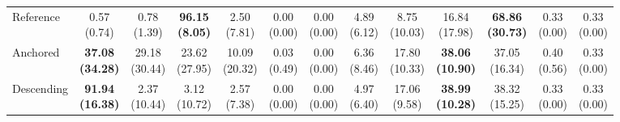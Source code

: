 {\begin{tabular}{l|cccccc|cccccc}
Reference & \makecell{0.57 \\ (0.74)} & \makecell{0.78 \\ (1.39)} & {\cellcolor[HTML]{C8E6C9}} \bfseries \makecell{96.15 \\ (8.05)} & \makecell{2.50 \\ (7.81)} & \makecell{0.00 \\ (0.00)} & \makecell{0.00 \\ (0.00)} & \makecell{4.89 \\ (6.12)} & \makecell{8.75 \\ (10.03)} & {\cellcolor[HTML]{C8E6C9}} \makecell{16.84 \\ (17.98)} & \bfseries \makecell{68.86 \\ (30.73)} & \makecell{0.33 \\ (0.00)} & \makecell{0.33 \\ (0.00)} \\
Anchored & \bfseries \makecell{37.08 \\ (34.28)} & \makecell{29.18 \\ (30.44)} & {\cellcolor[HTML]{C8E6C9}} \makecell{23.62 \\ (27.95)} & \makecell{10.09 \\ (20.32)} & \makecell{0.03 \\ (0.49)} & \makecell{0.00 \\ (0.00)} & \makecell{6.36 \\ (8.46)} & \makecell{17.80 \\ (10.33)} & {\cellcolor[HTML]{C8E6C9}} \bfseries \makecell{38.06 \\ (10.90)} & \makecell{37.05 \\ (16.34)} & \makecell{0.40 \\ (0.56)} & \makecell{0.33 \\ (0.00)} \\
Descending & \bfseries \makecell{91.94 \\ (16.38)} & \makecell{2.37 \\ (10.44)} & {\cellcolor[HTML]{C8E6C9}} \makecell{3.12 \\ (10.72)} & \makecell{2.57 \\ (7.38)} & \makecell{0.00 \\ (0.00)} & \makecell{0.00 \\ (0.00)} & \makecell{4.97 \\ (6.40)} & \makecell{17.06 \\ (9.58)} & {\cellcolor[HTML]{C8E6C9}} \bfseries \makecell{38.99 \\ (10.28)} & \makecell{38.32 \\ (15.25)} & \makecell{0.33 \\ (0.00)} & \makecell{0.33 \\ (0.00)} \\
\bottomrule
\end{tabular}
}%
